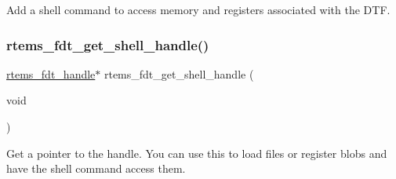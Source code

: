 Add a shell command to access memory and registers associated with the D\+TF. \mbox{\label{rtems-fdt-shell_8h_a60aacc9efa15224a053dc5c51f1cbd4b}} 
\subsubsection{\texorpdfstring{rtems\_fdt\_get\_shell\_handle()}{rtems\_fdt\_get\_shell\_handle()}}
{\footnotesize\ttfamily \mbox{\hyperlink{structrtems__fdt__handle}{rtems\+\_\+fdt\+\_\+handle}}$\ast$ rtems\+\_\+fdt\+\_\+get\+\_\+shell\+\_\+handle (\begin{DoxyParamCaption}\item[{void}]{ }\end{DoxyParamCaption})}

Get a pointer to the handle. You can use this to load files or register blobs and have the shell command access them. 